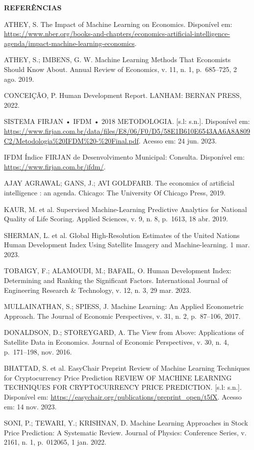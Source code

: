 \documentclass[
]{article}
\begin{document}
\textbf{REFERÊNCIAS}

ATHEY, S. The Impact of Machine Learning on Economics. Disponível em:
\url{https://www.nber.org/books-and-chapters/economics-artificial-intelligence-agenda/impact-machine-learning-economics}.

ATHEY, S.; IMBENS, G. W. Machine Learning Methods That Economists Should
Know About. Annual Review of Economics, v. 11, n. 1, p.~685--725, 2 ago.
2019.

CONCEIÇÃO, P. Human Development Report. LANHAM: BERNAN PRESS, 2022.

SISTEMA FIRJAN • IFDM • 2018 METODOLOGIA. {[}s.l: s.n.{]}. Disponível
em:
\url{https://www.firjan.com.br/data/files/E8/06/F0/D5/58E1B610E6543AA6A8A809C2/Metodologia\%20IFDM\%20-\%20Final.pdf}.
Acesso em: 24 jun. 2023.

IFDM \textbar{} Índice FIRJAN de Desenvolvimento Municipal: Consulta.
Disponível em: \url{https://www.firjan.com.br/ifdm/}.

AJAY AGRAWAL; GANS, J.; AVI GOLDFARB. The economics of artificial
intelligence : an agenda. Chicago: The University Of Chicago Press,
2019.

KAUR, M. et al. Supervised Machine-Learning Predictive Analytics for
National Quality of Life Scoring. Applied Sciences, v. 9, n. 8, p.~1613,
18 abr. 2019.

SHERMAN, L. et al. Global High-Resolution Estimates of the United
Nations Human Development Index Using Satellite Imagery and
Machine-learning. 1 mar. 2023.

TOBAIGY, F.; ALAMOUDI, M.; BAFAIL, O. Human Development Index:
Determining and Ranking the Significant Factors. International Journal
of Engineering Research \& Technology, v. 12, n. 3, 29 mar. 2023.

MULLAINATHAN, S.; SPIESS, J. Machine Learning: An Applied Econometric
Approach. The Journal of Economic Perspectives, v. 31, n. 2, p.~87--106,
2017.

DONALDSON, D.; STOREYGARD, A. The View from Above: Applications of
Satellite Data in Economics. Journal of Economic Perspectives, v. 30, n.
4, p.~171--198, nov. 2016.

BHATTAD, S. et al. EasyChair Preprint Review of Machine Learning
Techniques for Cryptocurrency Price Prediction REVIEW OF MACHINE
LEARNING TECHNIQUES FOR CRYPTOCURRENCY PRICE PREDICTION. {[}s.l:
s.n.{]}. Disponível em:
\url{https://easychair.org/publications/preprint_open/t5fX}. Acesso em:
14 nov. 2023.

SONI, P.; TEWARI, Y.; KRISHNAN, D. Machine Learning Approaches in Stock
Price Prediction: A Systematic Review. Journal of Physics: Conference
Series, v. 2161, n. 1, p.~012065, 1 jan. 2022.
\end{document}
